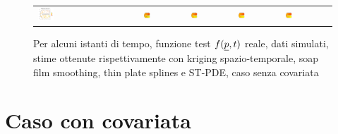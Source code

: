 \documentclass[a4paper,11pt,twoside,openright]{book}							%
\begin{document}
\begin{landscape}
\begin{figure}
\begin{tabular}{lcccccc}
\includegraphics[trim=0.8cm 0.8cm 2.5cm 1.2cm,clip=true,width=0.19\textwidth,valign=t]{Immagini/simulazioni/Dati_tempo4.png}&
\includegraphics[trim=0cm 0cm 0cm 1.8cm,clip=true,width=0.19\textwidth,valign=t]{Immagini/simulazioni/KRIGtempo4.png}&
\includegraphics[trim=0cm 0cm 0cm 1.8cm,clip=true,width=0.19\textwidth,valign=t]{Immagini/simulazioni/TPStempo4.png}&
\includegraphics[trim=0cm 0cm 0cm 1.8cm,clip=true,width=0.19\textwidth,valign=t]{Immagini/simulazioni/SOAPtempo4.png}&
\includegraphics[trim=0cm 0cm 0cm 1.8cm,clip=true,width=0.19\textwidth,valign=t]{Immagini/simulazioni/STSRtempo4.png}

\end{tabular}
\caption{Per alcuni istanti di tempo, funzione test $f(\protect\underline{p},t)$ reale, dati simulati, stime ottenute rispettivamente con kriging spazio-temporale, soap film smoothing, thin plate splines e ST-PDE, caso senza covariata}
\label{fig:confronto_altri_metodi_nocov}
\end{figure}
\end{landscape}

\section{Caso con covariata}
\end{document}
